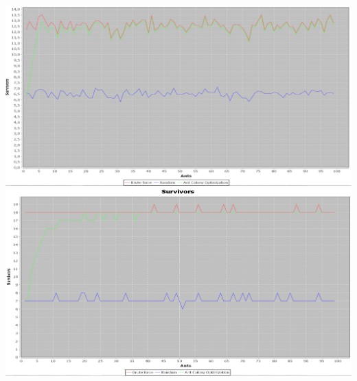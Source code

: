 \includegraphics[width=150mm]{Float8Nodes2Leathal1Exitpng.png}
\includegraphics[width=150mm]{40Nodes2Leathal2Exit.png}